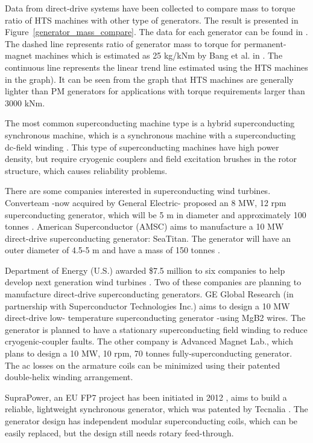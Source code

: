 \documentclass[a4paper, 11pt]{article} %
\begin{document}
Data from direct-drive systems have been collected to compare mass to torque ratio of HTS machines with other type of generators. The result is presented in Figure~\ref{generator_mass_compare}. The data for each generator can be found in \cite{Keysan2011b}. The dashed line represents ratio of generator mass to torque for permanent-magnet machines which is estimated as 25 kg/kNm by Bang et al. in \cite{Bang2008}. The continuous line represents the linear trend line estimated using the HTS machines in the graph). It can be seen from the graph that HTS machines are generally lighter than PM generators for applications with torque requirements larger than 3000 kNm. 


The most common superconducting machine type is a hybrid superconducting synchronous machine, which is a synchronous machine with a superconducting dc-field winding \cite{Kalsi2004a,Gieras2008a}.  This type of superconducting machines have high power density, but require cryogenic couplers and field excitation brushes in the rotor structure, which causes reliability problems. 

There are some companies interested in superconducting wind turbines. Converteam -now acquired by General Electric- proposed an 8 MW, 12 rpm superconducting generator, which will be 5 m in diameter and approximately 100 tonnes \cite{Lewis2007}. American Superconductor (AMSC) aims to manufacture a 10 MW direct-drive superconducting generator: SeaTitan. The generator will have an outer diameter of 4.5-5 m and have a mass of 150 tonnes \cite{Snitchler2011}.

Department of Energy (U.S.) awarded \$7.5 million to six companies to help develop next generation wind turbines \cite{dep_energy}. Two of these companies are planning to manufacture direct-drive superconducting generators. GE Global Research (in partnership with Superconductor Technologies Inc.) aims to design a 10 MW direct-drive low- temperature superconducting generator -using MgB2 wires. The generator is planned to have a stationary superconducting field winding to reduce cryogenic-coupler faults. The other company is Advanced Magnet Lab., which plans to design a 10 MW, 10 rpm, 70 tonnes fully-superconducting generator. The ac losses on the armature coils can be minimized using their patented double-helix winding arrangement.

SupraPower, an EU FP7 project has been initiated in 2012 \cite{suprapower}, aims to build a reliable, lightweight synchronous generator, which was patented by Tecnalia \cite{SarmientoMunoz2011}. The generator design has independent modular superconducting coils, which can be easily replaced, but the design still needs rotary feed-through.
\end{document}
